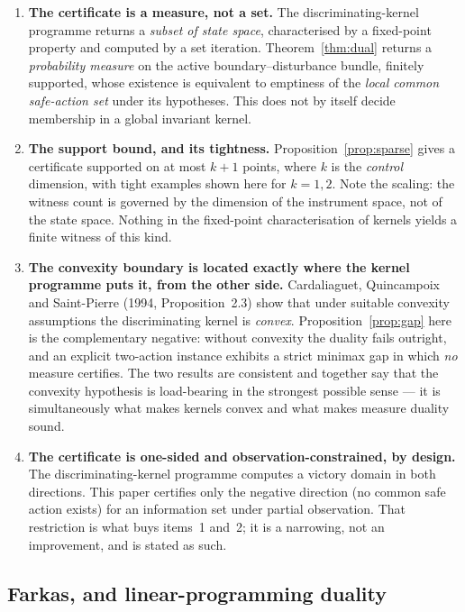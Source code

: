 \documentclass[10pt,twocolumn]{article}
\theoremstyle{definition}
\begin{document}
\begin{enumerate}
\item \textbf{The certificate is a measure, not a set.} The discriminating-kernel programme
  returns a \emph{subset of state space}, characterised by a fixed-point property and computed
  by a set iteration. Theorem~\ref{thm:dual} returns a \emph{probability measure} on the
  active boundary--disturbance bundle, finitely supported, whose existence is equivalent to
  emptiness of the \emph{local common safe-action set} under its hypotheses.
  This does not by itself decide membership in a global invariant kernel.
\item \textbf{The support bound, and its tightness.} Proposition~\ref{prop:sparse} gives a
  certificate supported on at most $k+1$ points, where $k$ is the \emph{control} dimension,
  with tight examples shown here for $k=1,2$. Note the scaling: the witness count is governed by the dimension
  of the instrument space, not of the state space. Nothing in the fixed-point characterisation
  of kernels yields a finite witness of this kind.
\item \textbf{The convexity boundary is located exactly where the kernel programme puts it,
  from the other side.} Cardaliaguet, Quincampoix and Saint-Pierre (1994, Proposition~2.3)
  show that under suitable convexity assumptions the discriminating kernel is
  \emph{convex}. Proposition~\ref{prop:gap} here is the complementary negative: without
  convexity the duality fails outright, and an explicit two-action instance exhibits a strict
  minimax gap in which \emph{no} measure certifies. The two results are consistent and
  together say that the convexity hypothesis is load-bearing in the strongest possible sense
  --- it is simultaneously what makes kernels convex and what makes measure duality sound.
\item \textbf{The certificate is one-sided and observation-constrained, by design.} The
  discriminating-kernel programme computes a victory domain in both directions. This paper
  certifies only the negative direction (no common safe action exists) for an information set
  under partial observation. That restriction is what buys items~1 and~2; it is a narrowing,
  not an improvement, and is stated as such.
\end{enumerate}

\subsection{Farkas, and linear-programming duality}
\end{document}
